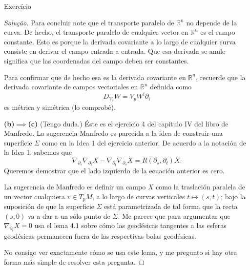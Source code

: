 \begin{thing6}{Exercício}
\begin{proof}[Solução]
Para concluir note que el transporte paralelo de \(\mathbb{R}^n\) no depende de la curva. De hecho, el transporte paralelo de cualquier vector en \(\mathbb{R}^n\) es el campo constante. Esto es porque la derivada covariante a lo largo de cualquier curva consiste en derivar el campo entrada a entrada. Que esa derivada se anule significa que las coordenadas del campo deben ser constantes. 

Para confirmar que de hecho esa es la derivada covariante en \(\mathbb{R}^n\), recuerde que la derivada covariante de campos vectoriales en \(\mathbb{R}^n\) definida como
\[D_{V_p}W=V_pW^i\partial_i\]
es métrica y simétrica (lo comprobé).

\textbf{(b)\(\implies\)(c)} {\color{2}(Tengo duda.)} Éste es el ejercicio 4 del capítulo IV del libro de Manfredo. La sugerencia Manfredo es parecida a la idea de construir una superfície \(\Sigma\) como en la Idea 1 del ejercicio anterior. De acuerdo a la notación de la Idea 1, sabemos que
	\[\nabla_{\partial_s} \nabla_{\partial_t}X-\nabla_{\partial_t} \nabla_{\partial_s}X=R(\partial_s,\partial_t)X.\]
Queremos demostrar que el lado izquierdo de la ecuación anterior es cero.

La sugerencia de Manfredo  es definir un campo \(X\) como la traslación paralela de un vector cualquiera \(v \in T_pM\), a lo largo de curvas verticales \(t \mapsto (s,t)\); bajo la suposición de que la superficie \(\Sigma\) está parametrizada de tal forma que la recta \((s,0)\) va a dar a un sólo punto de \(\Sigma\). Me parece que para argumentar que \(\nabla_{\partial_t}X=0\) usa el lema 4.1 sobre  cómo las geodésicas tangentes a las esferas geodésicas permanecen fuera de las respectivas bolas geodésicas.

No consigo ver exactamente cómo se usa este lema, y me pregunto si hay otra forma más simple de resolver esta pregunta.


\end{proof}
\end{thing6}
